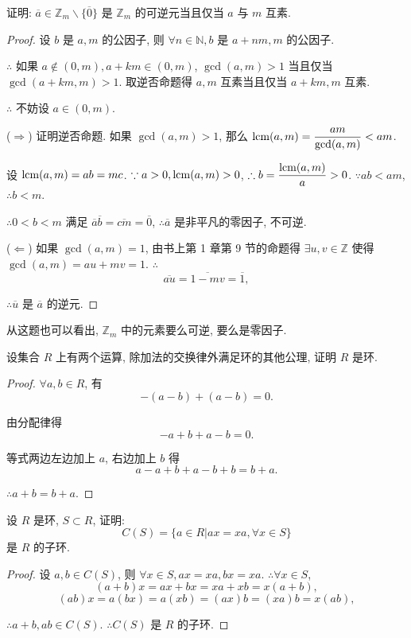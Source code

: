 \documentclass[color=black,device=normal,lang=cn,mode=geye]{elegantnote}
\begin{document}
\begin{exercisec}[5.3.5,有修改]\label{exc5.3.5}
    证明: $\overline{a}\in\mathbb{Z}_m\backslash\{\overline{0}\}$ 是 $\mathbb{Z}_m$ 的可逆元当且仅当 $a$ 与 $m$ 互素.
\end{exercisec}
\begin{proof}
    设 $b$ 是 $a,m$ 的公因子, 则 $\forall n\in\mathbb{N},b$ 是 $a+nm,m$ 的公因子.

    $\therefore$ 如果 $a\notin(0,m),a+km\in(0,m)$, $\gcd(a,m)>1$ 当且仅当 $\gcd(a+km,m)>1$. 取逆否命题得 $a,m$ 互素当且仅当 $a+km,m$ 互素.
    
    $\therefore$ 不妨设 $a\in(0,m)$.

    ($\Rightarrow$) 证明逆否命题. 如果 $\gcd(a,m)>1$, 那么 $\operatorname{lcm}(a,m)=\dfrac{am}{\gcd(a,m)}<am$.

    设 $\operatorname{lcm}(a,m)=ab=mc$. $\because a>0,\operatorname{lcm}(a,m)>0$, $\therefore b=\dfrac{\operatorname{lcm}(a,m)}{a}>0$. $\because ab<am$, $\therefore b<m$.
    
    $\therefore 0<b<m$ 满足 $\overline{a}\overline{b}=\overline{cm}=\overline{0}$, $\therefore\overline{a}$ 是非平凡的零因子, 不可逆.

    ($\Leftarrow$) 如果 $\gcd(a,m)=1$, 由书上第 1 章第 9 节的命题得 $\exists u,v\in\mathbb{Z}$ 使得 $\gcd(a,m)=au+mv=1$. $\therefore$
    \[\overline{au}=\overline{1-mv}=\overline{1},\]

    $\therefore\overline{u}$ 是 $\overline{a}$ 的逆元.
\end{proof}
\begin{note}
    从这题也可以看出, $\mathbb{Z}_m$ 中的元素要么可逆, 要么是零因子.
\end{note}
\begin{exercisec}[5.3.6]
    设集合 $R$ 上有两个运算, 除加法的交换律外满足环的其他公理, 证明 $R$ 是环.
\end{exercisec}
\begin{proof}
    $\forall a,b\in R$, 有
    \[-(a-b)+(a-b)=0.\]

    由分配律得
    \[-a+b+a-b=0.\]

    等式两边左边加上 $a$, 右边加上 $b$ 得
    \[a-a+b+a-b+b=b+a.\]

    $\therefore a+b=b+a$.
\end{proof}
\begin{exercisec}[5.3.10]
    设 $R$ 是环, $S\subset R$, 证明:
    \[C(S)=\{a\in R|ax=xa,\forall x\in S\}\]
    是 $R$ 的子环.
\end{exercisec}
\begin{proof}
    设 $a,b\in C(S)$, 则 $\forall x\in S,ax=xa,bx=xa$. $\therefore\forall x\in S$,
    \[(a+b)x=ax+bx=xa+xb=x(a+b),\]
    \[(ab)x=a(bx)=a(xb)=(ax)b=(xa)b=x(ab),\]

    $\therefore a+b,ab\in C(S)$. $\therefore C(S)$ 是 $R$ 的子环.
\end{proof}
\end{document}
